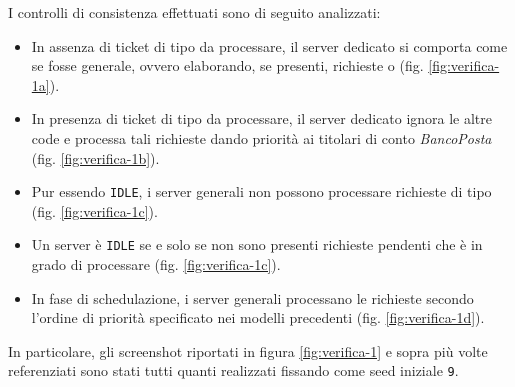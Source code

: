 I controlli di consistenza effettuati sono di seguito analizzati:
\begin{itemize}
\item In assenza di ticket di tipo \sr{} da processare, il server dedicato si comporta come se fosse generale, ovvero elaborando, se presenti, richieste \uo{} o \pp{} (fig. \ref{fig:verifica-1a}).
\item In presenza di ticket di tipo \sr{} da processare, il server dedicato ignora le altre code e processa tali richieste dando priorità ai titolari di conto \textsl{BancoPosta} (fig. \ref{fig:verifica-1b}).
\item Pur essendo \texttt{IDLE}, i server generali non possono processare richieste di tipo \sr{} (fig. \ref{fig:verifica-1c}).
\item Un server è \texttt{IDLE} se e solo se non sono presenti richieste pendenti che è in grado di processare (fig. \ref{fig:verifica-1c}).
\item In fase di schedulazione, i server generali processano le richieste secondo l'ordine di priorità specificato nei modelli precedenti (fig. \ref{fig:verifica-1d}).
\end{itemize}

In particolare, gli screenshot riportati in figura \ref{fig:verifica-1} e sopra più volte referenziati sono stati tutti quanti realizzati fissando come seed iniziale \texttt{9}.